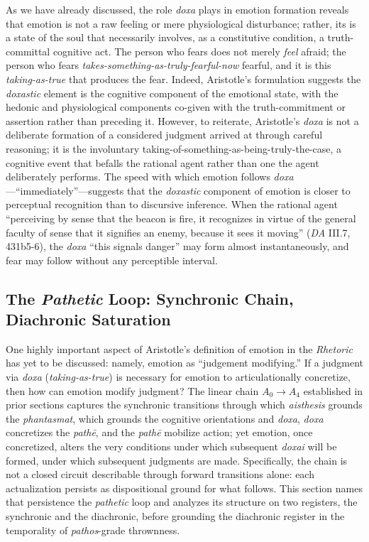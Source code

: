 \documentclass{article}
\begin{document}
As we have already discussed, the role \textit{doxa} plays in emotion formation reveals that emotion is not a raw feeling or mere physiological disturbance; rather, its is a state of the soul that necessarily involves, as a constitutive condition, a truth-committal cognitive act. The  person who fears does not merely \textit{feel} afraid; the person who fears \textit{takes-something-as-truly-fearful-now} fearful, and it is this \textit{taking-as-true} that produces the fear. Indeed, Aristotle's formulation suggests the \textit{doxastic} element is the cognitive component of the emotional state, with the hedonic and physiological components co-given with the truth-commitment or assertion rather than preceding it. However, to reiterate, Aristotle's \textit{doxa} is not a deliberate formation of a considered judgment arrived at through careful reasoning; it is the involuntary taking-of-something-as-being-truly-the-case, a cognitive event that befalls the rational agent rather than one the agent deliberately performs. The speed with which emotion follows \textit{doxa}---``immediately''---suggests that the \textit{doxastic} component of emotion is closer to perceptual recognition than to discursive inference. When the rational agent ``perceiving by sense that the beacon is fire, it recognizes in virtue of the general faculty of sense that it signifies an enemy, because it sees it moving'' (\textit{DA} III.7, 431b5-6), the \textit{doxa} ``this signals danger'' may form almost instantaneously, and fear may follow without any perceptible interval. 

\subsection{The \textit{Pathetic} Loop: Synchronic Chain, Diachronic Saturation}

One highly important aspect of Aristotle's definition of emotion in the \textit{Rhetoric} has yet to be discussed: namely, emotion as ``judgement modifying.'' If a judgment via \textit{doxa} (\textit{taking-as-true}) is necessary for emotion to articulationally concretize, then how can emotion modify judgment? The linear chain $A_0 \rightarrow A_4$ established in prior sections captures the synchronic transitions through which \textit{aisthesis} grounds the \textit{phantasmat}, which grounds the  cognitive orientations and \textit{doxa}, \textit{doxa} concretizes the \textit{path\=e}, and the \textit{path\=e} mobilize action; yet emotion, once concretized, alters the very conditions under which subsequent \textit{doxai} will be formed, under which subsequent judgments are made. Specifically, the chain is not a closed circuit describable through forward transitions alone: each actualization persists as dispositional ground for what follows. This section names that persistence the \textit{pathetic} loop and analyzes its structure on two registers, the synchronic and the diachronic, before grounding the diachronic register in the temporality of \textit{pathos}-grade thrownness.
\end{document}
